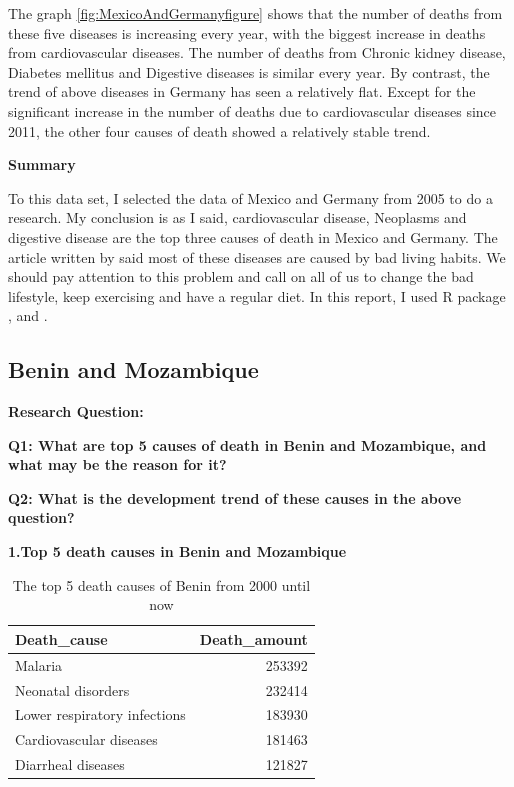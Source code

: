 \documentclass[11pt,a4paper,]{article}
\begin{document}
The graph \ref{fig:MexicoAndGermanyfigure} shows that the number of deaths from these five diseases is increasing every year, with the biggest increase in deaths from cardiovascular diseases. The number of deaths from Chronic kidney disease, Diabetes mellitus and Digestive diseases is similar every year. By contrast, the trend of above diseases in Germany has seen a relatively flat. Except for the significant increase in the number of deaths due to cardiovascular diseases since 2011, the other four causes of death showed a relatively stable trend.

\textbf{Summary}

To this data set, I selected the data of Mexico and Germany from 2005 to do a research. My conclusion is as I said, cardiovascular disease, Neoplasms and digestive disease are the top three causes of death in Mexico and Germany. The article written by \textcite{miller1997exercise} said most of these diseases are caused by bad living habits. We should pay attention to this problem and call on all of us to change the bad lifestyle, keep exercising and have a regular diet. In this report, I used R package \textcite{tidyverse}, \textcite{ggplot2} and \textcite{readr}.

\clearpage

\hypertarget{benin-and-mozambique}{%
\subsection{Benin and Mozambique}\label{benin-and-mozambique}}

\textbf{Research Question:}

\textbf{Q1: What are top 5 causes of death in Benin and Mozambique, and what may be the reason for it?}

\textbf{Q2: What is the development trend of these causes in the above question?}

\textbf{1.Top 5 death causes in Benin and Mozambique}

\begin{table}

\caption{\label{tab:Benintopfivedeathrate}The top 5 death causes of Benin from 2000 until now}
\centering
\begin{tabular}[t]{l|r}
\hline
Death\_cause & Death\_amount\\
\hline
Malaria & 253392\\
\hline
Neonatal disorders & 232414\\
\hline
Lower respiratory infections & 183930\\
\hline
Cardiovascular diseases & 181463\\
\hline
Diarrheal diseases & 121827\\
\hline
\end{tabular}
\end{table}
\end{document}
